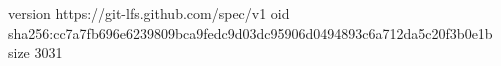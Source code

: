 version https://git-lfs.github.com/spec/v1
oid sha256:cc7a7fb696e6239809bca9fedc9d03dc95906d0494893c6a712da5c20f3b0e1b
size 3031
